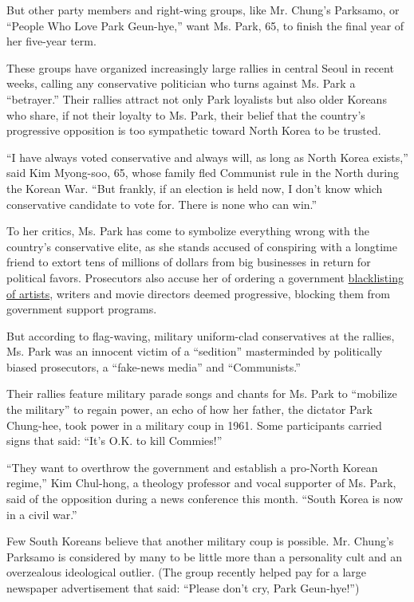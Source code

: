 But other party members and right-wing groups, like Mr. Chung's
Parksamo, or ``People Who Love Park Geun-hye,'' want Ms. Park, 65, to
finish the final year of her five-year term.

These groups have organized increasingly large rallies in central Seoul
in recent weeks, calling any conservative politician who turns against
Ms. Park a ``betrayer.'' Their rallies attract not only Park loyalists
but also older Koreans who share, if not their loyalty to Ms. Park,
their belief that the country's progressive opposition is too
sympathetic toward North Korea to be trusted.

``I have always voted conservative and always will, as long as North
Korea exists,'' said Kim Myong-soo, 65, whose family fled Communist rule
in the North during the Korean War. ``But frankly, if an election is
held now, I don't know which conservative candidate to vote for. There
is none who can win.''

To her critics, Ms. Park has come to symbolize everything wrong with the
country's conservative elite, as she stands accused of conspiring with a
longtime friend to extort tens of millions of dollars from big
businesses in return for political favors. Prosecutors also accuse her
of ordering a government
\href{https://www.nytimes.com/2017/01/12/world/asia/south-korea-president-park-blacklist-artists.html}{blacklisting
of artists}, writers and movie directors deemed progressive, blocking
them from government support programs.

But according to flag-waving, military uniform-clad conservatives at the
rallies, Ms. Park was an innocent victim of a ``sedition'' masterminded
by politically biased prosecutors, a ``fake-news media'' and
``Communists.''

Their rallies feature military parade songs and chants for Ms. Park to
``mobilize the military'' to regain power, an echo of how her father,
the dictator Park Chung-hee, took power in a military coup in 1961. Some
participants carried signs that said: ``It's O.K. to kill Commies!''

``They want to overthrow the government and establish a pro-North Korean
regime,'' Kim Chul-hong, a theology professor and vocal supporter of Ms.
Park, said of the opposition during a news conference this month.
``South Korea is now in a civil war.''

Few South Koreans believe that another military coup is possible. Mr.
Chung's Parksamo is considered by many to be little more than a
personality cult and an overzealous ideological outlier. (The group
recently helped pay for a large newspaper advertisement that said:
``Please don't cry, Park Geun-hye!'')

